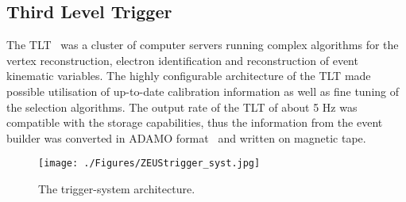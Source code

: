 \subsection{Third Level Trigger}
\label{subsec:tlt}
The TLT~\cite{Bailey:1992iq,Bhadra:1989kz} was a cluster of computer servers running complex algorithms for the vertex reconstruction, electron identification and reconstruction of event kinematic variables. The highly configurable architecture of the TLT made possible utilisation of up-to-date calibration information as well as fine tuning of the selection algorithms. The output rate of the TLT of about 5 Hz was compatible with the storage capabilities, thus the information from the event builder was converted in ADAMO format~\cite{Hart:1990dz} and written on magnetic tape.

\begin{figure}[h]
	\centering
		\texttt{[image: ./Figures/ZEUStrigger\_syst.jpg]}
	\caption{The \zeus trigger-system architecture.}
	\label{fig:trigarch}
\end{figure}
\newpage
